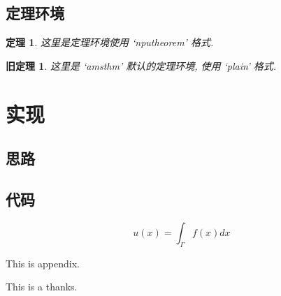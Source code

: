 \documentclass[twoside,UTF8,phd]{nputhesis}
\newtheorem{thm}{定理}[section]
\theoremstyle{plain}
\newtheorem{oldthm}{旧定理}[section]
\begin{document}
\section{定理环境}
\lipsum[1]
\begin{thm}
    这里是定理环境使用 `nputheorem' 格式.
\end{thm}
\lipsum[2]
\begin{oldthm}
    这里是 `amsthm' 默认的定理环境, 使用 `plain' 格式.
\end{oldthm}
\lipsum[3]

\chapter{实现}
\section{思路}
\section{代码}
\begin{equation}
    u(x) = \int_{\Gamma} f(x)dx
\end{equation}

\backmatter



\Appendix
This is appendix.

\Thanks
This is a thanks.

\Work

\statement
\end{document}
